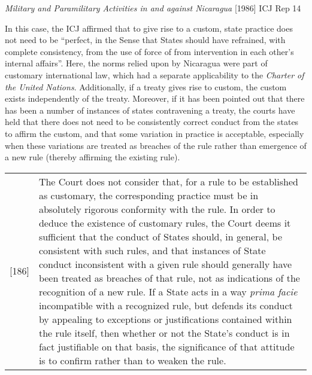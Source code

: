 \begin{casedetails}{\textit{Military and Paramilitary Activities in and against Nicaragua} [1986] ICJ Rep 14}
    \tcblower

    \flushleft
    In this case, the ICJ affirmed that to give rise to a custom, state practice does not need to be ``perfect, in the Sense that States should have refrained, with complete consistency, from the use of force of from intervention in each other's internal affairs''. Here, the norms relied upon by Nicaragua were part of customary international law, which had a separate applicability to the \textit{Charter of the United Nations}. Additionally, if a treaty gives rise to custom, the custom exists independently of the treaty. Moreover, if it has been pointed out that there has been a number of instances of states contravening a treaty, the courts have held that there does not need to be consistently correct conduct from the states to affirm the custom, and that some variation in practice is acceptable, especially when these variations are treated as breaches of the rule rather than emergence of a new rule (thereby affirming the existing rule).

    \begin{longtable}{r|>{\raggedright\arraybackslash}p{}}
        [186] & The Court does not consider that, for a rule to be established as customary, the corresponding practice must be in absolutely rigorous conformity with the rule. In order to deduce the existence of customary rules, the Court deems it sufficient that the conduct of States should, in general, be consistent with such rules, and that instances of State conduct inconsistent with a given rule should generally have been treated as breaches of that rule, not as indications of the recognition of a new rule. If a State acts in a way \textit{prima facie} incompatible with a recognized rule, but defends its conduct by appealing to exceptions or justifications contained within the rule itself, then whether or not the State's conduct is in fact justifiable on that basis, the significance of that attitude is to confirm rather than to weaken the rule. 
    \end{longtable}    
\end{casedetails}

